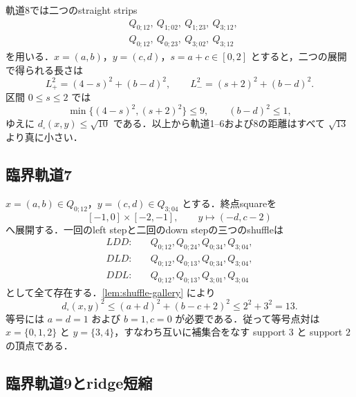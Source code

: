 \documentclass[a4paper,11pt]{ltjsarticle}
\numberwithin{equation}{section}
\theoremstyle{plain}
\theoremstyle{definition}
\theoremstyle{remark}
\begin{document}
軌道8では二つのstraight strips
\begin{align}
 &Q_{0;12},\ Q_{1;02},\ Q_{1;23},\ Q_{3;12},\label{eq:orbit8-right}\\
 &Q_{0;12},\ Q_{0;23},\ Q_{3;02},\ Q_{3;12}\label{eq:orbit8-left}
\end{align}
を用いる．$x=(a,b)$，$y=(c,d)$，$s=a+c\in[0,2]$ とすると，二つの展開で得られる長さは
\begin{equation}\label{eq:orbit8-lengths}
 L_+^2=(4-s)^2+(b-d)^2,
 \qquad
 L_-^2=(s+2)^2+(b-d)^2.
\end{equation}
区間 $0\le s\le2$ では
\begin{equation}\label{eq:orbit8-min}
 \min\{(4-s)^2,(s+2)^2\}\le9,
 \qquad (b-d)^2\le1,
\end{equation}
ゆえに $d_\square(x,y)\le\sqrt{10}$ である．以上から軌道1--6および8の距離はすべて
$\sqrt{13}$ より真に小さい．

\subsection{臨界軌道7}

$x=(a,b)\in Q_{0;12}$，$y=(c,d)\in Q_{3;04}$ とする．終点squareを
\begin{equation}\label{eq:orbit7-endmap}
 [ -1,0]\times[-2,-1],
 \qquad y\longmapsto(-d,c-2)
\end{equation}
へ展開する．一回のleft stepと二回のdown stepの三つのshuffleは
\begin{align}
 LDD:&\quad Q_{0;12},Q_{0;24},Q_{0;34},Q_{3;04},\label{eq:orbit7-LDD}\\
 DLD:&\quad Q_{0;12},Q_{0;13},Q_{0;34},Q_{3;04},\label{eq:orbit7-DLD}\\
 DDL:&\quad Q_{0;12},Q_{0;13},Q_{3;01},Q_{3;04}\label{eq:orbit7-DDL}
\end{align}
として全て存在する．\cref{lem:shuffle-gallery} により
\begin{equation}\label{eq:orbit7-bound}
 d_\square(x,y)^2
 \le(a+d)^2+(b-c+2)^2
 \le 2^2+3^2=13.
\end{equation}
等号には $a=d=1$ および $b=1,c=0$ が必要である．従って等号点対は
$x=\{0,1,2\}$ と $y=\{3,4\}$，すなわち互いに補集合をなす support $3$ と support $2$ の頂点である．

\subsection{臨界軌道9とridge短縮}
\end{document}
